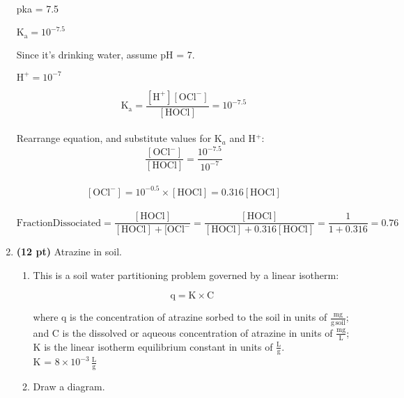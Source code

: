 \documentclass[12pt,letterpaper]{article}
\begin{document}
\begin{enumerate}
pka = 7.5

$\mathrm{K_a} = 10^{-7.5}$

Since it's drinking water, assume pH = 7.

$\mathrm{H^+} = 10^{-7}$

\begin{equation*}
\mathrm{K_a = \frac{[H^+][OCl^-]}{[HOCl]} = 10^{-7.5}}
\end{equation*}\\

Rearrange equation, and substitute values for K$_a$ and H$^+$:\\

\begin{equation*}
\mathrm{\frac{[OCl^-]}{[HOCl]} = \frac{10^{-7.5}}{10^{-7}}}
\end{equation*}\\

\begin{equation*}
\mathrm{[OCl^-] = 10^{-0.5}\times [HOCl] = 0.316[HOCl]}
\end{equation*}\\

\begin{equation*}
\mathrm{Fraction Dissociated = \frac{[HOCl]}{[HOCl] + [OCl^-} = \frac{[HOCl]}{[HOCl] + 0.316[HOCl]} = \frac{1}{1+ 0.316} = 0.76}
\end{equation*}


\vspace{0.2in}

\item \textbf{(12 pt)} Atrazine in soil. 

\begin{enumerate}
\item  This is a soil water partitioning problem governed by a linear isotherm:

\begin{equation*}
\mathrm{q = K\times C}
\end{equation*}

where q is the concentration of atrazine sorbed to the soil in units of $\mathrm{\frac{mg}{g\, soil}}$; and C is the dissolved or aqueous concentration of atrazine in units of $\mathrm{\frac{mg}{L}}$; K is the linear isotherm equilibrium constant in units of $\mathrm{\frac{L}{g}}$.\\

K = $\mathrm{8\times 10^{-3}\, \frac{L}{g}}$

\item Draw a diagram.


\end{enumerate}
\end{enumerate}
\end{document}
